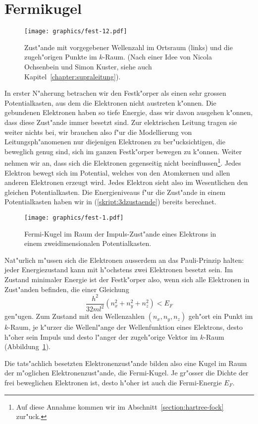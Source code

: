 \section{Fermikugel}
\begin{figure}
\centering
\texttt{[image: graphics/fest-12.pdf]}
\caption{Zust"ande mit vorgegebener Wellenzahl im Ortsraum (links) und
die zugeh"origen Punkte im $k$-Raum.
(Nach einer Idee von Nicola Ochsenbein und Simon Kuster, siehe auch
Kapitel~\ref{chapter:supraleitung}).
\label{skript:kraum}}
\end{figure}
In erster N"aherung betrachen wir den Festk"orper als einen
sehr grossen Potentialkasten, aus dem die Elektronen nicht austreten
k"onnen.
Die gebundenen Elektronen haben so tiefe Energie, dass wir davon
ausgehen k"onnen, dass diese Zust"ande immer besetzt sind.
Zur elektrischen Leitung tragen sie weiter nichts bei, wir brauchen also f"ur
die Modellierung von Leitungsph"anomenen nur diejenigen Elektronen
zu ber"ucksichtigen, die beweglich genug sind, sich im ganzen
Festk"orper bewegen zu k"onnen.
Weiter nehmen wir an, dass sich die Elektronen gegenseitig 
nicht beeinflussen\footnote{Auf diese Annahme kommen wir im
Abschnitt~\ref{section:hartree-fock} zur"uck.}.
Jedes Elektron bewegt sich im Potential, welches von den Atomkernen
und allen anderen Elektronen erzeugt wird.
Jedes Elektron sieht also im Wesentlichen den gleichen Potentialkasten.
Die Energieniveaus f"ur die Zust"ande in einem Potentialkasten haben
wir in (\ref{skript:3dzustaende}) bereits berechnet.
\begin{figure}
\centering
\texttt{[image: graphics/fest-1.pdf]}
\caption{Fermi-Kugel im Raum der Impuls-Zust"ande eines Elektrons in einem
zweidimensionalen Potentialkasten.
\label{skript:fermi-kugel}}
\end{figure}
Nat"urlich m"ussen sich die Elektronen ausserdem an das Pauli-Prinzip
halten: jeder Energiezustand kann mit h"ochstens zwei Elektronen
besetzt sein. 
Im Zustand minimaler Energie ist der Festk"orper also, wenn sich
alle Elektronen in Zust"anden befinden, die einer Gleichung
\[
\frac{h^2}{32ml^2}(
n_x^2
+
n_y^2
+
n_z^2
)
<
E_F
\]
gen"ugen.
Zum Zustand mit den Wellenzahlen $(n_x,n_y,n_z)$ geh"ort ein Punkt
im $k$-Raum, je k"urzer die Wellenl"ange der Wellenfunktion eines
Elektrons, desto h"oher sein Impuls und desto l"anger der zugeh"orige
Vektor im $k$-Raum (Abbildung~\ref{skript:kraum}).

Die tats"achlich besetzten Elektronenzust"ande bilden also eine Kugel
im Raum der m"oglichen Elektronenzust"ande, die Fermi-Kugel.
Je gr"osser die Dichte der frei beweglichen Elektronen ist, desto
h"oher ist auch die Fermi-Energie $E_F$.

